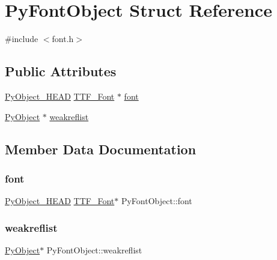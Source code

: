 \hypertarget{struct_py_font_object}{}\section{Py\+Font\+Object Struct Reference}
\label{struct_py_font_object}


{\ttfamily \#include $<$font.\+h$>$}

\subsection*{Public Attributes}
\begin{DoxyCompactItemize}
\item 
\mbox{\hyperlink{_python27_2object_8h_a0bf35c1f3ea13f925de94d8593db3b7e}{Py\+Object\+\_\+\+H\+E\+AD}} \mbox{\hyperlink{_s_d_l__ttf_8h_ac3b14e1c2946c0cf19776fe568d9abcf}{T\+T\+F\+\_\+\+Font}} $\ast$ \mbox{\hyperlink{struct_py_font_object_aa1a9ceab75d3105938f7bc2d4ac574e5}{font}}
\item 
\mbox{\hyperlink{_python27_2object_8h_aadc84ac7aed2cfa6f20c25f62bf3dac7}{Py\+Object}} $\ast$ \mbox{\hyperlink{struct_py_font_object_ae7e2bf718c030b855390eb7de940f051}{weakreflist}}
\end{DoxyCompactItemize}


\subsection{Member Data Documentation}
\mbox{\label{struct_py_font_object_aa1a9ceab75d3105938f7bc2d4ac574e5}} 
\subsubsection{\texorpdfstring{font}{font}}
{\footnotesize\ttfamily \mbox{\hyperlink{_python27_2object_8h_a0bf35c1f3ea13f925de94d8593db3b7e}{Py\+Object\+\_\+\+H\+E\+AD}} \mbox{\hyperlink{_s_d_l__ttf_8h_ac3b14e1c2946c0cf19776fe568d9abcf}{T\+T\+F\+\_\+\+Font}}$\ast$ Py\+Font\+Object\+::font}

\mbox{\label{struct_py_font_object_ae7e2bf718c030b855390eb7de940f051}} 
\subsubsection{\texorpdfstring{weakreflist}{weakreflist}}
{\footnotesize\ttfamily \mbox{\hyperlink{_python27_2object_8h_aadc84ac7aed2cfa6f20c25f62bf3dac7}{Py\+Object}}$\ast$ Py\+Font\+Object\+::weakreflist}



